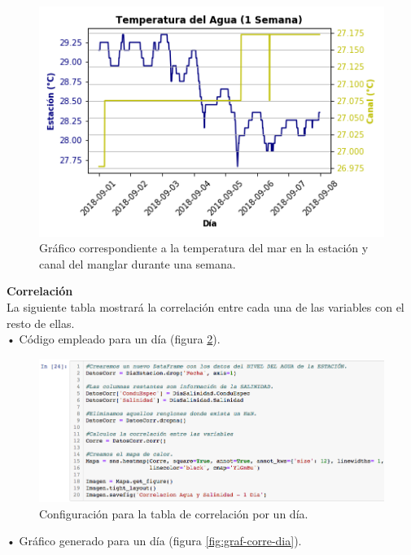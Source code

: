 \documentclass[12pt]{article}
\begin{document}
\begin{figure}[h!]
	\center
	\includegraphics[scale=.6]{Temperatura-del-Agua-Semana}
	\caption{\label{fig:graf-temp-sem} Gráfico correspondiente a la temperatura del mar en la estación y canal del manglar durante una semana.}
\end{figure}
\noindent \textbf{Correlación} \\
La siguiente tabla mostrará la correlación entre cada una de las variables con el resto de ellas. \\

\noindent • Código empleado para un día (figura \ref{fig:cod-corre-dia}). \\

\begin{figure}[h!]
	\center
	\includegraphics[scale=.55]{./Images/corre-dia}
	\caption{\label{fig:cod-corre-dia} Configuración para la tabla de correlación por un día.}
\end{figure}

\noindent • Gráfico generado para un día (figura \ref{fig:graf-corre-dia}). \\
\end{document}
